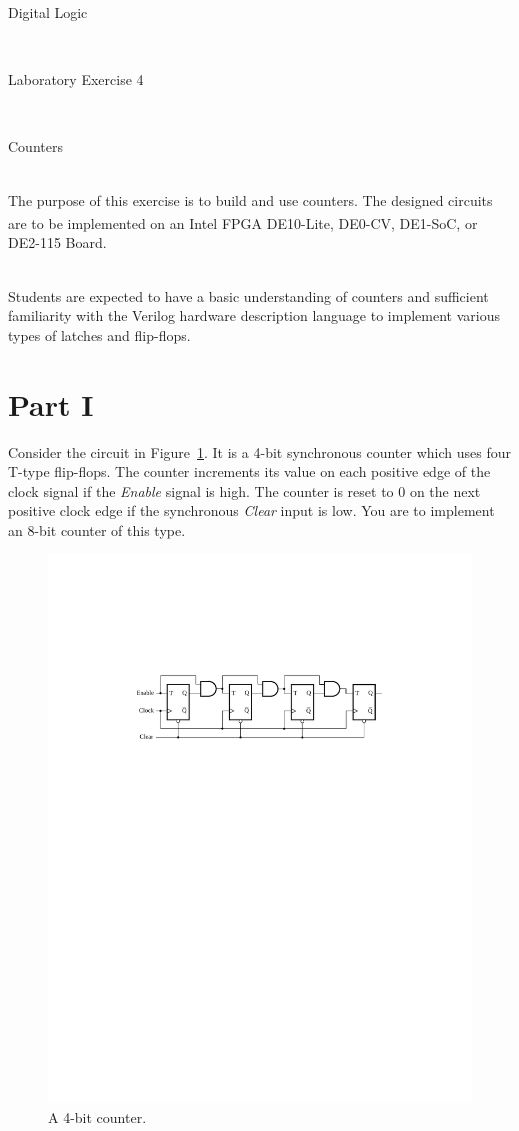 \documentclass[epsfig,10pt,fullpage]{article}
\newcommand{\LabNum}{4}
\begin{document}
\centerline{\huge Digital Logic}
~\\
\centerline{\huge Laboratory Exercise \LabNum}
~\\
\centerline{\large Counters}
~\\

The purpose of this exercise is to build and use counters. The designed circuits are to be
implemented on an Intel\textsuperscript{\textregistered} FPGA DE10-Lite, DE0-CV, DE1-SoC, or DE2-115 Board.

~\\
Students are expected to have a basic understanding of counters and sufficient familiarity
with the Verilog hardware description language to implement various types of latches and flip-flops.

\section*{Part I}
Consider the circuit in Figure~\ref{fig:asynchronous_counter}. It is a 4-bit synchronous 
counter which uses four
T-type flip-flops. The counter increments its value on each positive edge of the clock signal
if the {\it Enable} signal is high. The counter is reset to 0 on the next positive
clock edge if the synchronous {\it Clear} input is low.
You are to implement an 8-bit counter of this type.

\begin{figure}[H]
	\begin{center}
		\includegraphics[]{figures/figure1.pdf}
	\end{center}
\caption{A 4-bit counter.}
\label{fig:asynchronous_counter}
\end{figure}
\end{document}
